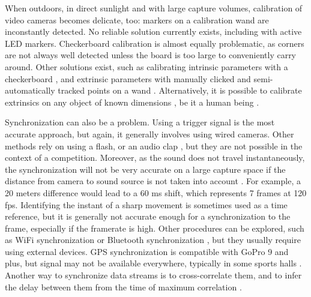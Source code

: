 When outdoors, in direct sunlight and with large capture volumes, calibration of video cameras becomes delicate, too: markers on a calibration wand are inconstantly detected. No reliable solution currently exists, including with active LED markers. Checkerboard calibration is almost equally problematic, as corners are not always well detected unless the board is too large to conveniently carry around. Other solutions exist, such as calibrating intrinsic parameters with a checkerboard \cite{Zhang2000}, and extrinsic parameters with manually clicked and semi-automatically tracked points on a wand \cite{Argus,Jackson2016}. 
Alternatively, it is possible to calibrate extrinsics on any object of known dimensions \cite{Dawson-Howe1994}, be it a human being \cite{Liu2022a}.

Synchronization can also be a problem. Using a trigger signal is the most accurate approach, but again, it generally involves using wired cameras. Other methods rely on using a flash, or an audio clap \cite{Jackson2016}, but they are not possible in the context of a competition. Moreover, as the sound does not travel instantaneously, the synchronization will not be very accurate on a large capture space if the distance from camera to sound source is not taken into account \cite{Hasler2009}. For example, a 20 meters difference would lead to a 60 ms shift, which represents 7 frames at 120 fps. Identifying the instant of a sharp movement is sometimes used as a time reference, but it is generally not accurate enough for a synchronization to the frame, especially if the framerate is high. Other procedures can be explored, such as WiFi synchronization \cite{Romanov2019} or Bluetooth synchronization \cite{Asgarian2022}, but they usually require using external devices. GPS synchronization is compatible with GoPro 9 and plus, but signal may not be available everywhere, typically in some sports halls \cite{GoPro2022}. Another way to synchronize data streams is to cross-correlate them, and to infer the delay between them from the time of maximum correlation \cite{Plotz2012}. 


